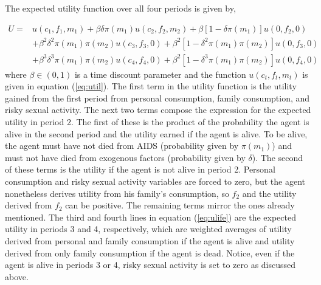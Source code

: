 \documentclass[12pt]{article}
\newcommand{\beq}{\begin{equation}}
\newcommand{\eeq}{\end{equation}}
\newcommand{\ds}{\displaystyle}
\begin{document}
The expected utility function over all four periods is given by,

\beq \label{eq:ulife} \begin{array}{ll} \ds U = & \ds u(c_1, f_1, m_1) + \beta \delta \pi(m_1) u(c_2, f_2, m_2) + \beta \left[1 - \delta \pi(m_1)\right] u(0,f_2,0) \\ [0.5pc]
 & \ds + \beta^2 \delta^2 \pi(m_1) \pi(m_2) u(c_3, f_3, 0) + \beta^2 \left[1 - \delta^2 \pi(m_1)\pi(m_2)\right] u(0, f_3, 0) \\ [0.5pc]
 & \ds + \beta^3 \delta^3 \pi(m_1) \pi(m_2) u(c_4, f_4, 0) + \beta^2 \left[1 - \delta^3 \pi(m_1)\pi(m_2)\right] u(0, f_4, 0)\end{array} \eeq
where $\beta \in (0,1)$ is a time discount parameter and the function $u(c_t, f_t, m_t)$ is given in equation (\ref{eq:util}).  The first term in the utility function is the utility gained from the first period from personal consumption, family consumption, and risky sexual activity.  The next two terms compose the expression for the expected utility in period 2.  The first of these is the product of the probability the agent is alive in the second period and the utility earned if the agent is alive.  To be alive, the agent must have not died from AIDS (probability given by $\pi(m_1)$) and must not have died from exogenous factors (probability given by $\delta$).  The second of these terms is the utility if the agent is not alive in period 2.  Personal consumption and risky sexual activity variables are forced to zero, but the agent nonetheless derives utility from his family's consumption, so $f_2$ and the utility derived from $f_2$ can be positive.  The remaining terms mirror the ones already mentioned.  The third and fourth lines in equation (\ref{eq:ulife}) are the expected utility in periods 3 and 4, respectively, which are weighted averages of utility derived from personal and family consumption if the agent is alive and utility derived from only family consumption if the agent is dead.  Notice, even if the agent is alive in periods 3 or 4, risky sexual activity is set to zero as discussed above.
\end{document}
